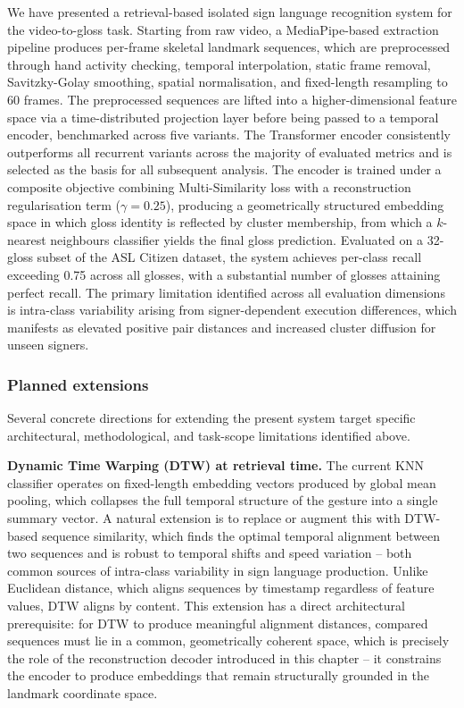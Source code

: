 We have presented a retrieval-based isolated sign language recognition system
for the video-to-gloss task. Starting from raw video, a MediaPipe-based
extraction pipeline produces per-frame skeletal landmark sequences, which are
preprocessed through hand activity checking, temporal interpolation, static
frame removal, Savitzky-Golay smoothing, spatial normalisation, and fixed-length
resampling to 60 frames. The preprocessed sequences are lifted into a
higher-dimensional feature space via a time-distributed projection layer before
being passed to a temporal encoder, benchmarked across five variants. The
Transformer encoder consistently outperforms all recurrent variants across the
majority of evaluated metrics and is selected as the basis for all subsequent
analysis. The encoder is trained under a composite objective combining
Multi-Similarity loss with a reconstruction regularisation term ($\gamma=0.25$),
producing a geometrically structured embedding space in which gloss identity is
reflected by cluster membership, from which a $k$-nearest neighbours classifier
yields the final gloss prediction. Evaluated on a 32-gloss subset of the ASL
Citizen dataset, the system achieves per-class recall exceeding 0.75 across all
glosses, with a substantial number of glosses attaining perfect recall. The
primary limitation identified across all evaluation dimensions is intra-class
variability arising from signer-dependent execution differences, which
manifests as elevated positive pair distances and increased cluster diffusion
for unseen signers.

\subsubsection{Planned extensions}

Several concrete directions for extending the present system target specific
architectural, methodological, and task-scope limitations identified above.

\textbf{Dynamic Time Warping (DTW) at retrieval time.} The current KNN
classifier operates on fixed-length embedding vectors produced by global mean
pooling, which collapses the full temporal structure of the gesture into a
single summary vector. A natural extension is to replace or augment this with
DTW-based sequence similarity, which finds the optimal temporal alignment
between two sequences and is robust to temporal shifts and speed variation --
both common sources of intra-class variability in sign language production.
Unlike Euclidean distance, which aligns sequences by timestamp regardless of
feature values, DTW aligns by content. This extension has a direct
architectural prerequisite: for DTW to produce meaningful alignment distances,
compared sequences must lie in a common, geometrically coherent space, which is
precisely the role of the reconstruction decoder introduced in this chapter --
it constrains the encoder to produce embeddings that remain structurally
grounded in the landmark coordinate space.

